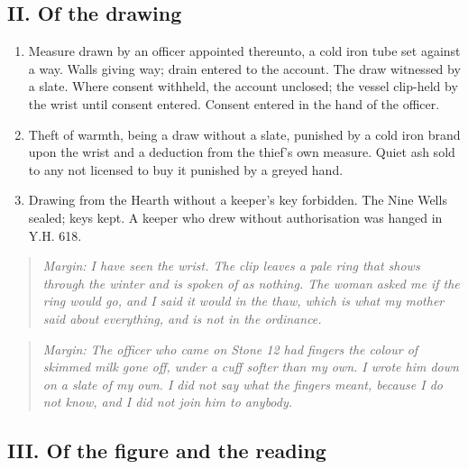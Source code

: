 \documentclass{design/chronicle}
\begin{document}
\subsection*{II. Of the drawing}

\begin{enumerate}[leftmargin=1.4em,itemsep=1pt,topsep=3pt,parsep=0pt]

\item Measure drawn by an officer appointed thereunto, a cold iron tube set against a way. Walls giving way; drain entered to the account. The draw witnessed by a slate. Where consent withheld, the account unclosed; the vessel clip-held by the wrist until consent entered. Consent entered in the hand of the officer.

\item Theft of warmth, being a draw without a slate, punished by a cold iron brand upon the wrist and a deduction from the thief’s own measure. Quiet ash sold to any not licensed to buy it punished by a greyed hand.

\item Drawing from the Hearth without a keeper’s key forbidden. The Nine Wells sealed; keys kept. A keeper who drew without authorisation was hanged in Y.H. 618.

\end{enumerate}

\begin{quote}\itshape \emph{Margin:} I have seen the wrist. The clip leaves a pale ring that shows through the winter and is spoken of as nothing. The woman asked me if the ring would go, and I said it would in the thaw, which is what my mother said about everything, and is not in the ordinance.\end{quote}

\begin{quote}\itshape \emph{Margin:} The officer who came on Stone 12 had fingers the colour of skimmed milk gone off, under a cuff softer than my own. I wrote him down on a slate of my own. I did not say what the fingers meant, because I do not know, and I did not join him to anybody.\end{quote}

\subsection*{III. Of the figure and the reading}
\end{document}
